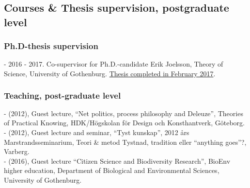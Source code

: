 \documentclass[a4paper,11pt,oneside]{article}
\begin{document}
{    %
    \subsection{Courses \& Thesis supervision, postgraduate level}

    \subsubsection{Ph.D-thesis supervision}
    - 2016 - 2017. Co-supervisor for Ph.D.-candidate Erik Joelsson, Theory of Science, University of Gothenburg. \href{https://gupea.ub.gu.se/handle/2077/51493}{Thesis completed in February 2017}.

    \subsubsection{Teaching, post-graduate level}
    - (2012), Guest lecture, ``Net politics, process philosophy and Deleuze'', Theories of Practical Knowing, HDK/Högskolan för Design och Konsthantverk, Göteborg.\\
    - (2012), Guest lecture and seminar, ``Tyst kunskap'', 2012 års Marstrandsseminarium, Teori & metod Tystnad, tradition eller ``anything goes''?, Varberg.\\
    - (2016), Guest lecture ``Citizen Science and Biodiversity Research'', BioEnv higher education, Department of Biological and Environmental Sciences, University of Gothenburg.\\





}
\end{document}
